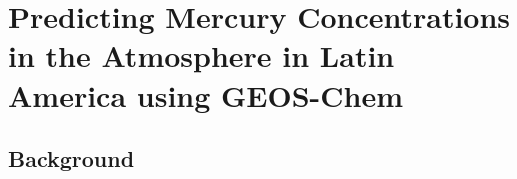 \chapter{Predicting Mercury Concentrations in the Atmosphere in Latin America using GEOS-Chem }
\section{Background}
